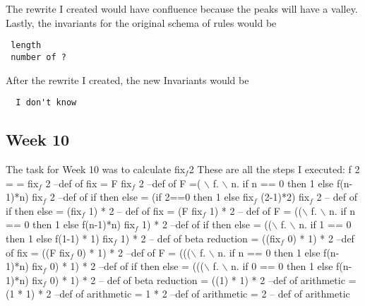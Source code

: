 \documentclass{article}
\theoremstyle{theorem}
\theoremstyle{definition}
\theoremstyle{remark}
\begin{document}
 \noindent\newline The rewrite I created would have confluence because the peaks will have a valley. Lastly, the invariants for the original schema of rules would be 
 
 \begin{verbatim}
 length
 number of ? 
 \end{verbatim}
  
  After the rewrite I created, the new Invariants would be
  \begin{verbatim}
  I don't know 
  \end{verbatim}
  
 \subsection{Week 10}
 The task for Week 10 was to calculate
 \newline
\newline fix$_f$2
 \newline
 \newline These are all the steps I executed: \newline
f 2 = \newline
= fix$_f$ 2 --def of fix\newline
= F fix$_f$ 2  --def of F\newline
=( $\backslash$ f. $\backslash$ n. if n == 0 then 1 else f(n-1)*n) fix$_f$ 2 --def of if then else\newline
=  (if 2==0 then 1 else fix$_f$ (2-1)*2) fix$_f$ 2 -- def of if then else\newline
= (fix$_f$ 1) * 2 -- def of fix\newline 
=  (F fix$_f$ 1) * 2  -- def of F\newline
= (($\backslash$ f. $\backslash$ n. if n == 0 then 1 else f(n-1)*n) fix$_f$ 1) * 2 --def of if then else\newline
= (($\backslash$ f. $\backslash$ n. if 1 == 0 then 1 else f(1-1) * 1) fix$_f$ 1) * 2 -- def of beta reduction\newline
= ((fix$_f$ 0) * 1) * 2 --def of fix\newline
= ((F fix$_f$ 0) * 1) * 2 --def of F\newline
= ((($\backslash$ f. $\backslash$ n. if n == 0 then 1 else f(n-1)*n) fix$_f$ 0) * 1) * 2 --def of if then else\newline
= ((($\backslash$ f. $\backslash$ n. if 0 == 0 then 1 else f(n-1)*n) fix$_f$ 0) * 1) * 2 -- def of beta reduction\newline
= ((1) * 1) * 2 --def of arithmetic\newline
= (1 * 1) * 2 --def of arithmetic \newline
= 1 * 2 --def of arithmetic \newline
= 2  -- def of arithmetic \newline
\end{document}
